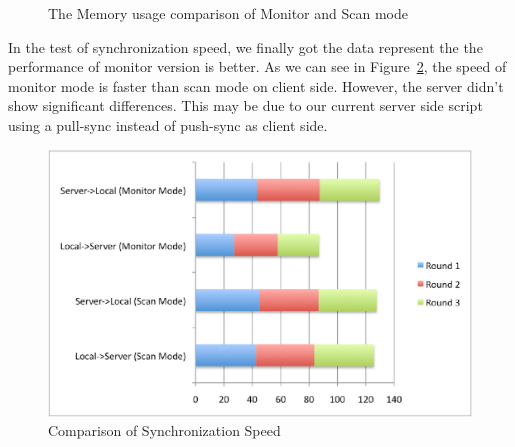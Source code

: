 \begin{figure}
\caption{The Memory usage comparison of Monitor and Scan mode}
\label{fig:memory}
\end{figure}

In the test of synchronization speed, we finally got the data represent the the performance of monitor version is better. 
As we can see in Figure~\ref{fig:speed}, the speed of monitor mode is faster than scan mode on client side. However, the 
server didn't show significant differences. This may be due to our current server side script using a pull-sync instead of push-sync as client side. 
\begin{figure}[htp]
\centering
\includegraphics[scale=0.7]{speed}
\caption{Comparison of Synchronization Speed}\label{fig:speed}
\end{figure}
